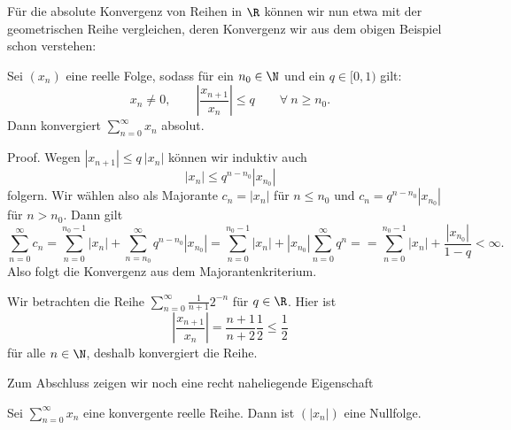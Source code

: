 \documentclass[letterpaper,10pt,english]{jupyterBook}
\begin{document}
Für die absolute Konvergenz von Reihen in \(\R\) können wir nun etwa mit der geometrischen Reihe vergleichen, deren Konvergenz wir aus dem obigen Beispiel schon verstehen:
\label{metrik/reihen:theorem-7}
\begin{theorem}{}{}



Sei \((x_n)\) eine reelle Folge, sodass für ein \(n_0 \in \N\) und ein \(q \in [0,1)\) gilt:
\begin{equation*}
x_n \neq 0,\qquad \left\vert \frac{x_{n+1}}{x_n} \right\vert \leq q \qquad \forall~n \geq n_0.
\end{equation*}
Dann konvergiert \(\sum_{n=0}^\infty x_n\) absolut.
\end{theorem}

\begin{emphBox}{}{}
Proof.  Wegen \(|x_{n+1}| \leq q~|x_n|\) können wir induktiv auch
\begin{equation*}
|x_n| \leq q^{n-n_0} |x_{n_0}|
\end{equation*}
folgern. Wir wählen also als Majorante \(c_n= |x_n|\) für \(n \leq n_0\) und \(c_n = q^{n-n_0} |x_{n_0}|\) für
\(n > n_0.\) Dann gilt
\begin{equation*}
 \sum_{n=0}^\infty c_n = \sum_{n=0}^{n_0-1} |x_n| + \sum_{n=n_0}^\infty q^{n-n_0} |x_{n_0}| =\sum_{n=0}^{n_0-1} |x_n| +  |x_{n_0}| \sum_{n=0}^\infty q^{n} = =\sum_{n=0}^{n_0-1} |x_n| +  \frac{|x_{n_0}|}{1-q} < \infty.
\end{equation*}
Also folgt die Konvergenz aus dem Majorantenkriterium.
\end{emphBox}
\label{metrik/reihen:example-8}
\begin{example}{}{}



Wir betrachten die Reihe \(\sum_{n=0}^\infty \frac{1}{n+1} 2^{-n}\) für \(q \in \R\). Hier ist
\begin{equation*}
  \left\vert \frac{x_{n+1}}{x_n} \right\vert  = \frac{n+1}{n+2} \frac{1}2 \leq \frac{1}2
\end{equation*}
für alle \(n \in \N\), deshalb konvergiert die Reihe.
\end{example}

Zum Abschluss zeigen wir noch eine recht naheliegende Eigenschaft
\label{metrik/reihen:lemma-9}
\begin{lemma}{}{}



Sei \(\sum_{n=0}^\infty x_n\) eine konvergente reelle Reihe. Dann ist \((|x_n|)\) eine Nullfolge.
\end{lemma}
\end{document}

